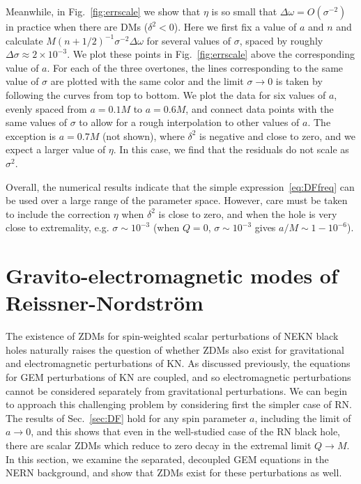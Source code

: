 \begin{refsection}
Meanwhile, in Fig.~\ref{fig:errscale} we show that $\eta$ is so small that $\Delta\omega = O(\sigma^{-2})$ in practice when there are DMs ($\delta^2<0$). 
Here we first fix a value of $a$ and $n$ and calculate  $M (n+1/2)^{-1}\sigma^{-2}\Delta \omega$ for several values of $\sigma$, spaced by roughly $\Delta \sigma \approx 2 \times 10^{-3}$. 
We plot these points in Fig.~\ref{fig:errscale} above the corresponding value of $a$. 
For each of the three overtones, the lines corresponding to the same value of $\sigma$ are plotted with the same color and the limit  $\mathcal \sigma \to 0$ is taken by following the curves from top to bottom. 
We plot the data for six values of $a$, evenly spaced from $a = 0.1 M$ to $a = 0.6 M$, and connect  data points with the same values of $\sigma$ to allow for a rough interpolation to other values of $a$.
The exception is $a = 0.7M$ (not shown), where $\delta^2$ is negative and close to zero, and we expect a larger value of $\eta$. In this case, we find that the residuals do not scale as $\sigma^{2}$.

Overall, the numerical results indicate that the simple expression~\eqref{eq:DFfreq} can be used over a large range of the parameter space. However, care must be taken to include the correction $\eta$ when $\delta^2$ is close to zero, and when the hole is very close to extremality, e.g. $\sigma \sim 10^{-3}$ (when $Q = 0$, $\sigma \sim 10^{-3}$ gives $a/M \sim 1 - 10^{-6}$).


\section{Gravito-electromagnetic modes of Reissner-Nordstr\"{o}m}
\label{sec:RN}

The existence of ZDMs for spin-weighted scalar perturbations of NEKN black holes naturally raises the question of whether ZDMs also exist for gravitational and electromagnetic perturbations of KN.
As discussed previously, the equations for GEM perturbations of KN are coupled, and so electromagnetic perturbations cannot be considered separately from gravitational perturbations.
We can begin to approach this challenging problem by considering first the simpler case of RN.
The results of Sec.~\ref{sec:DF} hold for any spin parameter $a$, including the limit of $a \to 0$, and this shows that even in the well-studied case of the RN black hole, there are scalar ZDMs which reduce to zero decay in the extremal limit $Q \to M$.
In this section, we examine the separated, decoupled GEM equations in the NERN background, and show that ZDMs exist for these perturbations as well.


\end{refsection}
